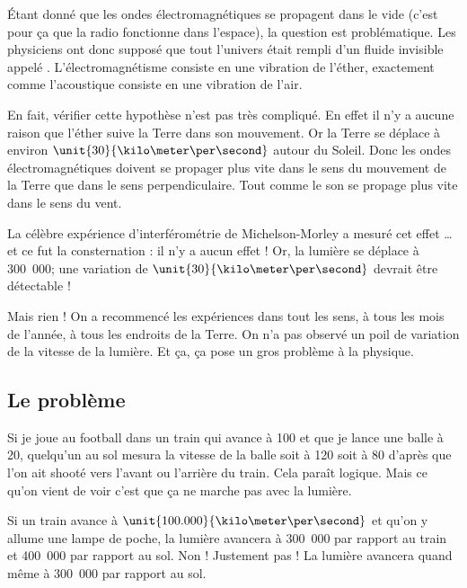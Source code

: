 Étant donné que les ondes électromagnétiques se propagent dans le vide (c'est pour ça que la radio fonctionne dans l'espace), la question est problématique. Les physiciens ont donc supposé que tout l'univers était rempli d'un fluide invisible appelé . L'électromagnétisme consiste en une vibration de l'éther, exactement comme l'acoustique consiste en une vibration de l'air.

En fait, vérifier cette hypothèse n'est pas très compliqué. En effet il n'y a aucune raison que l'éther suive la Terre dans son mouvement. Or la Terre se déplace à environ \( \unit{30}{\kilo\meter\per\second}\) autour du Soleil. Donc les ondes électromagnétiques doivent se propager plus vite dans le sens du mouvement de la Terre que dans le sens perpendiculaire. Tout comme le son se propage plus vite dans le sens du vent.

La célèbre expérience d'interférométrie de Michelson-Morley\cite{BIBooJSDSooIUhMQQ} a mesuré cet effet \ldots et ce fut la consternation : il n'y a aucun effet ! Or, la lumière se déplace à \unit{300.000}{\kilo\meter\per\second}; une variation de \( \unit{30}{\kilo\meter\per\second}\) devrait être détectable !

Mais rien ! On a recommencé les expériences dans tout les sens, à tous les mois de l'année, à tous les endroits de la Terre. On n'a pas observé un poil de variation de la vitesse de la lumière. Et ça, ça pose un gros problème à la physique.


\subsection{Le problème}

Si je joue au football dans un train qui avance à \unit{100}{\kilo\meter\per\hour} et que je lance une balle à \unit{20}{\kilo\meter\per\hour}, quelqu'un au sol mesura la vitesse de la balle soit à \unit{120}{\kilo\meter\per\hour} soit à \unit{80}{\kilo\meter\per\hour} d'après que l'on ait shooté vers l'avant ou l'arrière du train. Cela paraît logique. Mais ce qu'on vient de voir c'est que ça ne marche pas avec la lumière.

Si un train avance à \( \unit{100.000}{\kilo\meter\per\second}\) et qu'on y allume une lampe de poche, la lumière avancera à \unit{300.000}{\kilo\meter\per\second} par rapport au train et \unit{400.000}{\kilo\meter\per\second} par rapport au sol. Non ! Justement pas ! La lumière avancera quand même à \unit{300.000}{\kilo\meter\per\second} par rapport au sol.

